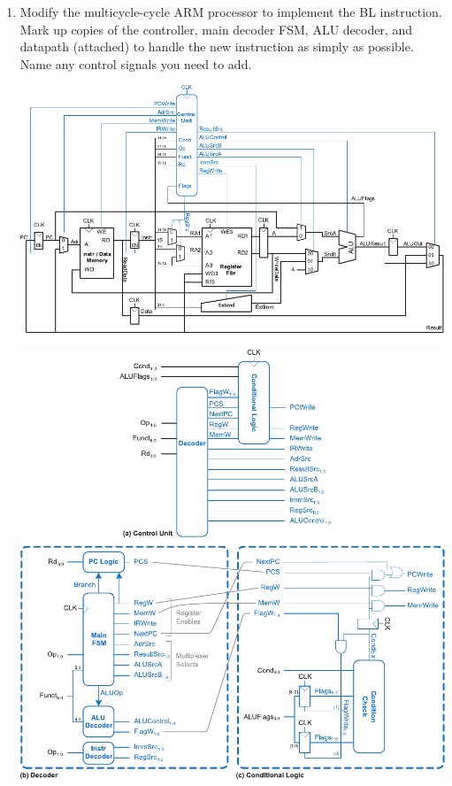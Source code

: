 \documentclass{e85}
\date{2019 April 24 (Wednesday)}
\author{}
\begin{document}
\begin{enumerate}
\item Modify the multicycle-cycle ARM processor to implement the BL
  instruction.  Mark up copies of the controller, main decoder FSM,
  ALU decoder, and datapath (attached) to handle the new instruction
  as simply as possible.  Name any control signals you need to add.

  \begin{solution}
    \begin{center}
      \includegraphics[width=\linewidth]
      {figures/1-bl/ddca-multicycle-datapath.pdf}

      \includegraphics[width=\linewidth]
      {figures/1-bl/ddca-multicycle-control-unit.pdf}


\end{center}
\end{solution}
\end{enumerate}
\end{document}
